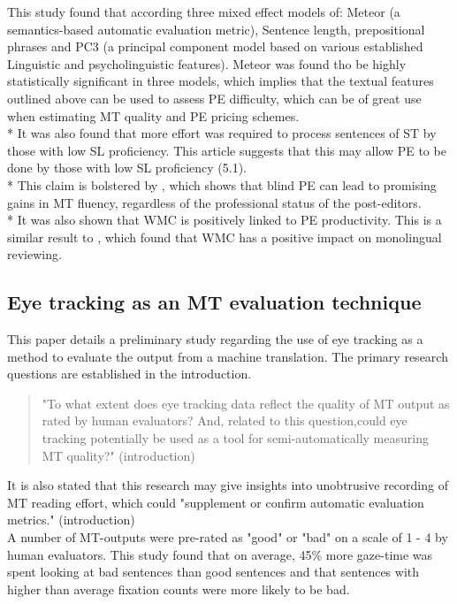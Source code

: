 \documentclass[12pt]{article}
\begin{document}
			This study found that according three mixed effect models of: Meteor (a semantics-based automatic evaluation metric)\cite{denkowski-lavie-2011-meteor}, Sentence length, prepositional phrases and PC3 (a principal component model based on various established Linguistic and psycholinguistic features).
			Meteor was found tho be highly statistically significant in three models, which implies that the textual features outlined above can be used to assess PE difficulty, which can be of great use when estimating MT quality and PE pricing schemes.\\*
			It was also found that more effort was required to process sentences of ST by those with low SL proficiency. This article suggests that this may allow PE to be done by those with low SL proficiency \cite{10.2307/44113775}(5.1).\\* This claim is bolstered by \textcite{comm}, which shows that blind PE can lead to promising gains in MT fluency, regardless of the professional status of the post-editors.\\*
			It was also shown that WMC is positively linked to PE productivity. This is a similar result to \textcite{10.2307/23359419}, which found that WMC has a positive impact on monolingual reviewing.
		
		\subsection{Eye tracking as an MT evaluation technique}
			This paper details a preliminary study regarding the use of eye tracking as a method to evaluate the output from a machine translation.
			The primary research questions are established in the introduction.
			\begin{quote}
				\label{sec:objective2}
				"To what extent does eye tracking data reflect the quality of MT output as rated by human evaluators? And, related to this question,could eye tracking potentially be used as a tool for semi-automatically measuring MT quality?"
				\cite{EyeTracking} (introduction)
			\end{quote}
			It is also stated that this research may give insights into unobtrusive recording of MT reading effort, which could "supplement or confirm automatic evaluation metrics."
			\cite{EyeTracking}(introduction)\\
			
			A number of MT-outputs were pre-rated as "good" or "bad" on a scale of 1 - 4 by human evaluators.
			This study found that on average, 45\% more gaze-time was spent looking at bad sentences than good sentences and that sentences with higher than average fixation counts were more likely to be bad.
			
\end{document}
